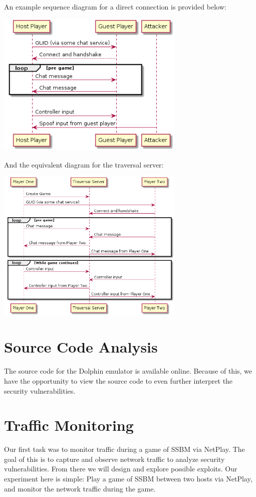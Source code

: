 \documentclass[conference]{IEEEtran}
\begin{document}
An example sequence diagram for a direct connection is provided below:
\begin{center}
\includegraphics[width=9cm]{Figures/Basic_Sequence}
\end{center}
\vspace{0.3cm}
And the equivalent diagram for the traversal server:
\begin{center}
\includegraphics[width=9cm]{Figures/Sequence_Traversal}
\end{center}
\vspace{0.3cm}
\section{Source Code Analysis}
The source code for the Dolphin emulator is available online. Because of this, we have the opportunity to view the source code to even further interpret the security vulnerabilities.
\section{Traffic Monitoring}
Our first task was to monitor traffic during a game of SSBM via NetPlay. 
The goal of this is to capture and observe network traffic to analyze security vulnerabilities. 
From there we will design and explore possible exploits.
Our experiment here is simple: Play a game of SSBM between two hosts via NetPlay, and monitor the network traffic during the game.
\end{document}
